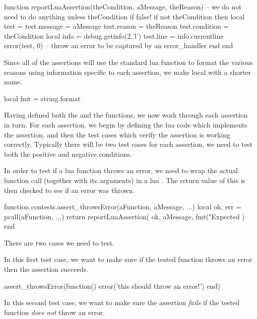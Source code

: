 \startLuaCode
function reportLuaAssertion(theCondition, aMessage, theReason)
  -- we do not need to do anything unless theCondition if false!
  if not theCondition then
    local test     = { }
    test.message   = aMessage
    test.reason    = theReason
    test.condition = theCondition
    local info     = debug.getinfo(2,'l')
    test.line      = info.currentline
    error(test, 0) -- throw an error to be captured by an error_handler
  end
end
\stopLuaCode

Since all of the assertions will use the standard lua  
function to format the various reasons using information specific to each 
assertion, we make  local with a shorter name. 

\startLuaCode
local fmt = string.format
\stopLuaCode

Having defined both the  and the  
functions, we now work through each assertion in turn. For each assertion, 
we begin by defining the lua code which implements the assertion, and then 
the test cases which verify the assertion is working correctly. Typically 
there will be two test cases for each assertion, we need to test both the 
positive and negative conditions. 


In order to test if a lua function throws an error, we need to wrap the 
actual function call (together with its arguments) in a lua . 
The return value of this  is then checked to see if an error 
was thrown. 

\startLuaCode
function contests.assert_throwsError(aFunction, aMessage, ...)
  local ok, err = pcall(aFunction, ...)
  return reportLuaAssertion(
    ok,
    aMessage,
    fmt("Expected %
  )
end
\stopLuaCode

There are two cases we need to test.


In this first test case, we want to make sure if the tested function 
throws an error then the assertion succeeds. 

\startLuaTest
  assert_throwsError(function()
    error('this should throw an error!')
  end)
\stopLuaTest
\stopTestCase


In this second test case, we want to make sure the assertion \emph{fails} 
if the tested function \emph{does not} throw an error.

